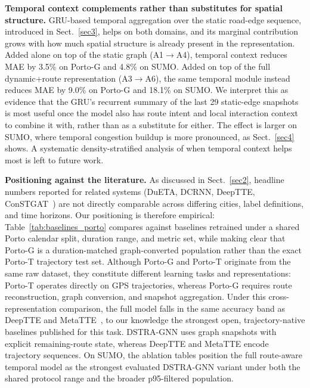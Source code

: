 \documentclass[pdflatex,sn-basic,Numbered]{sn-jnl}%
\begin{document}
\textbf{Temporal context complements rather than substitutes for spatial structure.} GRU-based temporal aggregation over the static road-edge sequence, introduced in Sect.~\ref{sec3}, helps on both domains, and its marginal contribution grows with how much spatial structure is already present in the representation. Added alone on top of the static graph (A1$\to$A4), temporal context reduces MAE by 3.5\% on Porto-G and 4.8\% on SUMO. Added on top of the full dynamic+route representation (A3$\to$A6), the same temporal module instead reduces MAE by 9.0\% on Porto-G and 18.1\% on SUMO. We interpret this as evidence that the GRU's recurrent summary of the last 29 static-edge snapshots is most useful once the model also has route intent and local interaction context to combine it with, rather than as a substitute for either. The effect is larger on SUMO, where temporal congestion buildup is more pronounced, as Sect.~\ref{sec4} shows. A systematic density-stratified analysis of when temporal context helps most is left to future work.

\textbf{Positioning against the literature.} As discussed in Sect.~\ref{sec2}, headline numbers reported for related systems (DuETA, DCRNN, DeepTTE, ConSTGAT~\cite{dueta2023,dcrnn2018,deepTTE2018,constgat2020}) are not directly comparable across differing cities, label definitions, and time horizons. Our positioning is therefore empirical: Table~\ref{tab:baselines_porto} compares against baselines retrained under a shared Porto calendar split, duration range, and metric set, while making clear that Porto-G is a duration-matched graph-converted population rather than the exact Porto-T trajectory test set. Although Porto-G and Porto-T originate from the same raw dataset, they constitute different learning tasks and representations: Porto-T operates directly on GPS trajectories, whereas Porto-G requires route reconstruction, graph conversion, and snapshot aggregation. Under this cross-representation comparison, the full model falls in the same accuracy band as DeepTTE and MetaTTE~\cite{wang2022metatte}, to our knowledge the strongest open, trajectory-native baselines published for this task. DSTRA-GNN uses graph snapshots with explicit remaining-route state, whereas DeepTTE and MetaTTE encode trajectory sequences. On SUMO, the ablation tables position the full route-aware temporal model as the strongest evaluated DSTRA-GNN variant under both the shared protocol range and the broader p95-filtered population.
\end{document}

